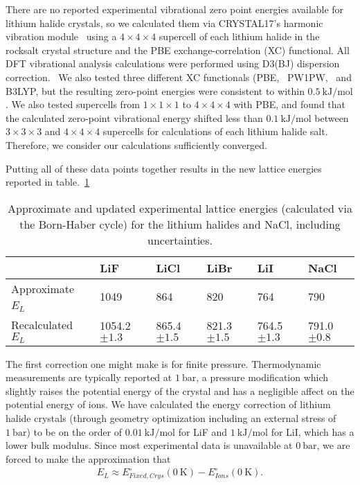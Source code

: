 \documentclass[preprint,aps,prb,floatfix]{revtex4-1}
\begin{document}
There are no reported experimental vibrational zero point energies available for lithium halide crystals, so we calculated them via CRYSTAL17's harmonic vibration module~\cite{Crystal17,pascale2004calculation,Crystal17Manual} using a $4\times4\times4$ supercell of each lithium halide in the rocksalt crystal structure and the PBE exchange-correlation (XC) functional. All DFT vibrational analysis calculations were performed using D3(BJ) dispersion correction.~\cite{Grimme2010,grimme2016dispersion,Becke2007,Grimme2011} We also tested three different XC functionals (PBE,~\cite{Perdew1996} PW1PW,~\cite{PW1PW} and B3LYP\cite{becke1988,lee1988,Becke1993}, but the resulting zero-point energies were consistent to within $\SI{0.5}{\kilo\joule\per\mole}$. We also tested supercells from $1\times1\times1$ to $4\times4\times4$ with PBE, and found that the calculated zero-point vibrational energy shifted less than $\SI{0.1}{\kilo\joule\per\mole}$ between $3\times3\times3$ and $4\times4\times4$ supercells for calculations of each lithium halide salt. Therefore, we consider our calculations sufficiently converged.

Putting all of these data points together results in the new lattice energies reported in table.~\ref{tab:Lattice_Energies}
%
\begin{table}
	\begin{tabular}{l|lllll}
		& LiF             & LiCl           & LiBr           & LiI            & NaCl           \\ \hline
		Approximate $E_{L}$~\cite{book:CRC} & 1049            & 864            & 820            & 764            & 790            \\
		Recalculated $E_{L}$                & 1054.2$\pm 1.3$ & 865.4$\pm 1.5$ & 821.3$\pm 1.5$ & 764.5$\pm 1.3$ & 791.0$\pm 0.8$
	\end{tabular}
\caption{\label{tab:Lattice_Energies} Approximate and updated experimental lattice energies (calculated via the Born-Haber cycle) for the lithium halides and NaCl, including uncertainties.}
\end{table}






	The first correction one might make is for finite pressure. Thermodynamic measurements are typically reported at $\SI{1}{\bar}$, a pressure modification which slightly raises the potential energy of the crystal and has a negligible affect on the potential energy of ions. We have calculated the energy correction of lithium halide crystals (through geometry optimization including an external stress of $\SI{1}{\bar}$) to be on the order of $\SI{0.01}{\kilo\joule\per\mole}$ for LiF and $\SI{1}{\kilo\joule\per\mole}$ for LiI, which has a lower bulk modulus. Since most experimental data is unavailable at $\SI{0}{\bar}$, we are forced to make the approximation that
\begin{align}
E_{L} \approx E_{Fixed,Crys}^{\circ} (\SI{0}{\kelvin}) - E_{Ions}^{\circ} (\SI{0}{\kelvin}).
\end{align}
\end{document}
